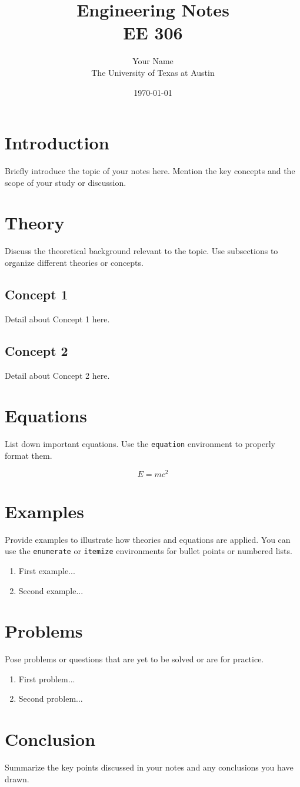 \documentclass[11pt]{article}
\title{Engineering Notes \\ EE 306}
\author{Your Name \\ The University of Texas at Austin} %
\date{\today} %
\begin{document}
\maketitle
\tableofcontents
\newpage

\section{Introduction}
Briefly introduce the topic of your notes here. Mention the key concepts and the scope of your study or discussion.

\section{Theory}
Discuss the theoretical background relevant to the topic. Use subsections to organize different theories or concepts.

\subsection{Concept 1}
Detail about Concept 1 here.

\subsection{Concept 2}
Detail about Concept 2 here.

\section{Equations}
List down important equations. Use the \texttt{equation} environment to properly format them.

\begin{equation}
E = mc^2
\end{equation}

\section{Examples}
Provide examples to illustrate how theories and equations are applied. You can use the \texttt{enumerate} or \texttt{itemize} environments for bullet points or numbered lists.

\begin{enumerate}
    \item First example...
    \item Second example...
\end{enumerate}

\section{Problems}
Pose problems or questions that are yet to be solved or are for practice.

\begin{enumerate}
    \item First problem...
    \item Second problem...
\end{enumerate}

\section{Conclusion}
Summarize the key points discussed in your notes and any conclusions you have drawn.

\end{document}
